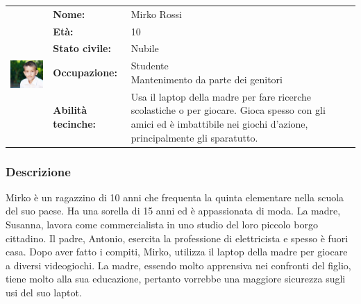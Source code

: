 \documentclass[../Report.tex]{subfiles}
\begin{document}
    \vspace{1.5cm}

    \begin{table}[H]
        \begin{tabular}{|c|l|p{7cm}|}
            \hline
            \multirow{5}{*}{\includegraphics[width=5cm, height=5cm]{Mirko.jpg}} 
                & \textbf{Nome:} & Mirko Rossi\\ \cmidrule{2-3}
            & \textbf{Età:} & 10 \\ \cmidrule{2-3}
            & \textbf{Stato civile:} & Nubile \\ \cmidrule{2-3}
            & \textbf{Occupazione:} & \makecell{Studente \\ Mantenimento da parte dei genitori} \\ \cmidrule{2-3}
            & \textbf{Abilità tecinche:} & Usa il laptop della madre per fare ricerche scolastiche o per giocare. Gioca spesso con gli amici ed è imbattibile nei giochi d'azione, principalmente gli sparatutto. \\
            \hline
        \end{tabular}
    \end{table}

    \subsubsection{Descrizione}
    Mirko è un ragazzino di 10 anni che frequenta la quinta elementare nella scuola del suo paese. Ha una sorella di 15 anni ed è appassionata di moda. La madre, Susanna, lavora come commercialista in uno studio del loro piccolo borgo cittadino. Il padre, Antonio, esercita la professione di elettricista e spesso è fuori casa. Dopo aver fatto i compiti, Mirko, utilizza il laptop della madre per giocare a diversi videogiochi. La madre, essendo molto apprensiva nei confronti del figlio, tiene molto alla sua educazione, pertanto vorrebbe una maggiore sicurezza sugli usi del suo laptot.

    \vspace{1.5cm}
\end{document}
